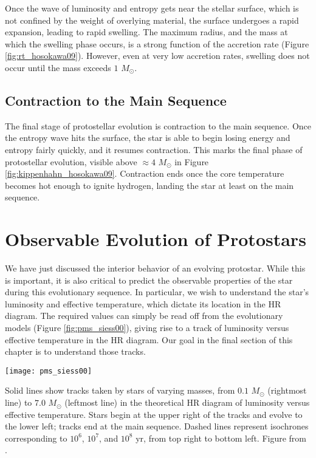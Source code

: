 Once the wave of luminosity and entropy gets near the stellar surface, which is not confined by the weight of overlying material, the surface undergoes a rapid expansion, leading to rapid swelling. The maximum radius, and the mass at which the swelling phase occurs, is a strong function of the accretion rate (Figure \ref{fig:rt_hosokawa09}). However, even at very low accretion rates, swelling does not occur until the mass exceeds $1$ $M_\odot$.

\subsection{Contraction to the Main Sequence}

The final stage of protostellar evolution is contraction to the main sequence. Once the entropy wave hits the surface, the star is able to begin losing energy and entropy fairly quickly, and it resumes contraction. This marks the final phase of protostellar evolution, visible above $\approx 4$ $M_\odot$ in Figure \ref{fig:kippenhahn_hosokawa09}. Contraction ends once the core temperature becomes hot enough to ignite hydrogen, landing the star at least on the main sequence.

\section{Observable Evolution of Protostars}


We have just discussed the interior behavior of an evolving protostar. While this is important, it is also critical to predict the observable properties of the star during this evolutionary sequence. In particular, we wish to understand the star's luminosity and effective temperature, which dictate its location in the HR diagram. The required values can simply be read off from the evolutionary models (Figure \ref{fig:pms_siess00}), giving rise to a track of luminosity versus effective temperature in the HR diagram. Our goal in the final section of this chapter is to understand those tracks.

\begin{marginfigure}
\texttt{[image: pms\_siess00]}
\caption[Pre-main sequence evolutionary tracks]{
\label{fig:pms_siess00}
Solid lines show tracks taken by stars of varying masses, from $0.1$ $M_\odot$ (rightmost line) to $7.0$ $M_\odot$ (leftmost line) in the theoretical HR diagram of luminosity versus effective temperature. Stars begin at the upper right of the tracks and evolve to the lower left; tracks end at the main sequence. Dashed lines represent isochrones corresponding to $10^6$, $10^7$, and $10^8$ yr, from top right to bottom left. Figure from \citet{siess00a}.
}
\end{marginfigure}

